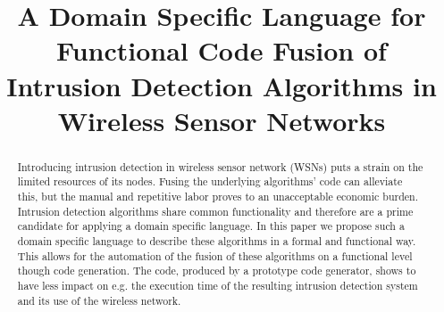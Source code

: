 \documentclass[conference]{IEEEtran}
\begin{document}
\expandafter\def\csname PY@tok@err\endcsname{}

\title{A Domain Specific Language for Functional Code Fusion of
       Intrusion Detection Algorithms in Wireless Sensor Networks}

\author{%
}

\maketitle

\begin{abstract}
  
Introducing intrusion detection in wireless sensor network (WSNs) puts a strain
on the limited resources of its nodes. Fusing the underlying algorithms' code
can alleviate this, but the manual and repetitive labor proves to an
unacceptable economic burden. Intrusion detection algorithms share common
functionality and therefore are a prime candidate for applying a domain
specific language. In this paper we propose such a domain specific language to
describe these algorithms in a formal and functional way. This allows for the
automation of the fusion of these algorithms on a functional level though code
generation. The code, produced by a prototype code generator, shows to have
less impact on e.g. the execution time of the resulting intrusion detection
system and its use of the wireless network.

\end{abstract}



\end{document}

